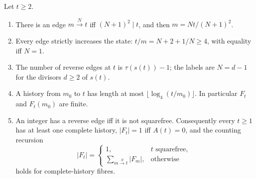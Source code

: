 \begin{proposition}\label{prop:reverse-edge}\label{prop:fibre-finite}
Let $t\ge2$.
\begin{enumerate}[label=(\alph*)]
\item There is an edge $m\xrightarrow{N}t$ iff $(N{+}1)^2\mid t$, and then $m=Nt/(N{+}1)^2$.
\item Every edge strictly increases the state: $t/m=N+2+1/N\ge4$, with equality iff $N=1$.
\item The number of reverse edges at $t$ is $\tau(s(t))-1$; the labels are $N=d-1$ for the divisors $d\ge2$ of $s(t)$.
\item A history from $m_0$ to $t$ has length at most $\lfloor\log_4(t/m_0)\rfloor$. In particular $F_t$ and $F_t(m_0)$ are finite.
\item An integer has a reverse edge iff it is not squarefree. Consequently every $t\ge1$ has at least one complete history, $|F_t|=1$ iff $A(t)=0$, and the counting recursion
\begin{equation}\label{eq:recursion}
|F_t|=\begin{cases}1,& t\text{ squarefree},\\ \sum_{m\xrightarrow{N}t}|F_m|,& \text{otherwise}\end{cases}
\end{equation}
holds for complete-history fibres.
\end{enumerate}
\end{proposition}
